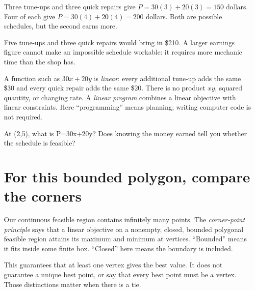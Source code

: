 \documentclass[11pt,letterpaper]{article}
\begin{document}
\begin{tcolorbox}[title={Example \textperiodcentered{} Feasible does not mean optimal},breakable]

Three tune-ups and three quick repairs give \(P=30(3)+20(3)=150\) dollars. Four of each give \(P=30(4)+20(4)=200\) dollars. Both are possible schedules, but the second earns more.


Five tune-ups and three quick repairs would bring in \$210. A larger earnings figure cannot make an impossible schedule workable: it requires more mechanic time than the shop has.


\end{tcolorbox}

A function such as \(30x+20y\) is \emph{linear}: every additional tune-up adds the same \$30 and every quick repair adds the same \$20. There is no product \(xy\), squared quantity, or changing rate. A \emph{linear program} combines a linear objective with linear constraints. Here ``programming'' means planning; writing computer code is not required.



\begin{tcolorbox}[title={Pause and try 1},breakable]
At (2,5), what is P=30x+20y? Does knowing the money earned tell you whether the schedule is feasible?
\end{tcolorbox}


\section{For this bounded polygon, compare the corners}

Our continuous feasible region contains infinitely many points. The \emph{corner-point principle} says that a linear objective on a nonempty, closed, bounded polygonal feasible region attains its maximum and minimum at vertices. ``Bounded'' means it fits inside some finite box. ``Closed'' here means the boundary is included.


This guarantees that at least one vertex gives the best value. It does not guarantee a unique best point, or say that every best point must be a vertex. Those distinctions matter when there is a tie.



\par{}\par\medskip
\end{document}
